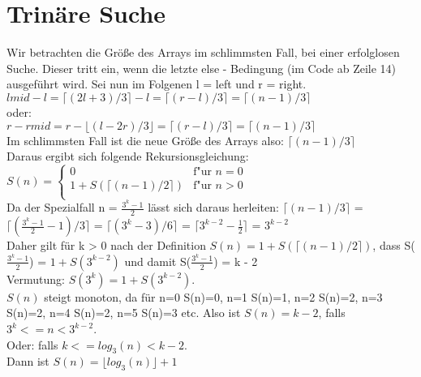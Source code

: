 \section{Trinäre Suche}
Wir betrachten die Größe des Arrays im schlimmsten Fall, bei einer erfolglosen Suche. Dieser tritt ein, wenn die letzte else - Bedingung (im Code ab Zeile 14) ausgeführt wird. Sei nun im Folgenen l = left und r = right. \\
$lmid - l = \lceil(2l + 3) / 3\rceil - l = \lceil(r - l) / 3\rceil = \lceil(n - 1) / 3\rceil $ \\
oder: \\
$r - rmid = r - \lfloor(l - 2r) / 3\rfloor = \lceil(r - l) / 3\rceil = \lceil(n - 1) / 3\rceil $ \\
Im schlimmsten Fall ist die neue Größe des Arrays also: $ \lceil(n - 1) / 3\rceil $ \\
Daraus ergibt sich folgende Rekursionsgleichung: \\
$S(n) = \begin{cases}
     0 & \text{f"ur }n = 0 \\
    1 + S(\lceil(n - 1) / 2\rceil) & \text{f"ur }n > 0 \\
   \end{cases}$ \\
Da der Spezialfall n = $\frac{3^k - 1}{2}$ lässt sich daraus herleiten: $ \lceil(n - 1) / 3\rceil $ = $ \lceil(\frac{3^k - 1}{2} - 1) / 3\rceil $ = $ \lceil(3^k - 3) / 6\rceil $ = $ \lceil3^{k-2} - \frac{1}{2}\rceil $ = $3^{k-2}$ \\
Daher gilt für k > 0 nach der Definition $S(n) = 1 + S(\lceil(n - 1) / 2\rceil)$, dass S($\frac{3^k - 1}{2}$) = $1 + S(3^{k-2})$ und damit S($\frac{3^k - 1}{2}$) = k - 2\\
Vermutung: $S(3^k) = 1 + S(3^{k-2}).$ \\
$S(n)$ steigt monoton, da für n=0  S(n)=0, n=1 S(n)=1, n=2 S(n)=2, n=3 S(n)=2, n=4 S(n)=2, n=5 S(n)=3 etc. Also ist $ S(n)= k-2$, falls $3^k <= n < 3^{k-2}$. \\
Oder: falls $k <= log_3(n) < k-2.$ \\
Dann ist $S(n) = \lfloor log_3(n)\rfloor + 1$